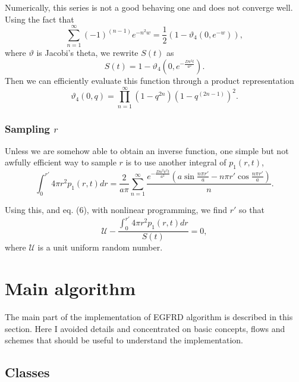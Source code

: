 \documentclass[english]{article}
\begin{document}
Numerically, this series is not a good behaving one and does not converge
well. Using the fact that \begin{equation}
\sum_{n=1}^{\infty}(-1)^{(n-1)}e^{-n^{2}w}=\frac{1}{2}(1-\vartheta_{4}(0,e^{-w})),\end{equation}
 where $\vartheta$ is Jacobi's theta, we rewrite $S(t)$ as \begin{equation}
S(t)=1-\vartheta_{4}(0,e^{-\frac{D\pi^{2}t}{a^{2}}}).\end{equation}
 Then we can efficiently evaluate this function through a product
representation \begin{equation}
\vartheta_{4}(0,q)=\prod_{n=1}^{\infty}(1-q^{2n})(1-q^{(2n-1)})^{2}.\end{equation}



\subsubsection{Sampling $r$}

Unless we are somehow able to obtain an inverse function, one simple
but not awfully efficient way to sample $r$ is to use another integral
of $p_{1}(r,t)$, \begin{equation}
\int_{0}^{r'}4\pi r^{2}p_{1}(r,t)dr=\frac{2}{a\pi}\sum_{n=1}^{\infty}\frac{e^{-\frac{Dn^{2}\pi^{2}t}{a^{2}}}\left(a\sin\frac{n\pi r'}{a}-n\pi r'\cos\frac{n\pi r'}{a}\right)}{n}.\end{equation}


Using this, and eq. (6), with nonlinear programming, we find $r'$
so that 
\begin{equation}
   \mathcal{U}-\frac{\int_{0}^{r'}4\pi r^{2}p_{1}(r,t)dr}{S(t)}=0,
\end{equation}
 where $\mathcal{U}$ is a unit uniform random number.


\section{Main algorithm}

The main part of the implementation of EGFRD algorithm is described
in this section.  Here I avoided details and concentrated on basic
concepts, flows and schemes that should be useful to understand
the implementation.  

\subsection{Classes}
\end{document}
